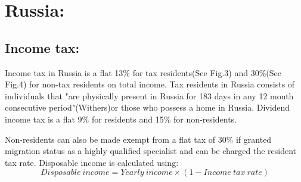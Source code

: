 \documentclass[12pt, a4paper]{article}
\begin{document}
\section{Russia:}
\subsection{Income tax:}
Income tax in Russia is a flat 13\% for tax residents(See Fig.3) and 30\%(See Fig.4) for non-tax residents on total income. Tax residents in Russia consists of individuals that "are physically present in Russia for 183 days in any 12 month consecutive period"(Withers)or those who possess a home in Russia.  Dividend income tax is a flat 9\% for residents and 15\% for non-residents. 
\newline

Non-residents can also be made exempt from a flat tax of 30\% if granted migration status as a highly qualified specialist and can be charged the resident tax rate. Disposable income is calculated using:
\begin{equation}
Disposable \ income = Yearly \ income \times(1 - Income \ tax \ rate)
\end{equation}
			
\end{document}
